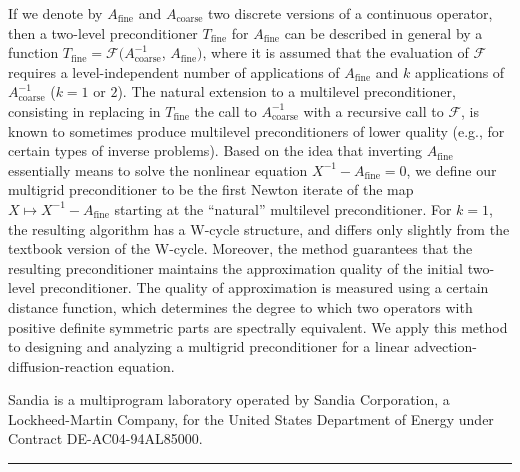 \documentclass[twosided]{report}
\begin{document}
If we denote by $A_{\mathrm{fine}}$ and
$A_{\mathrm{coarse}}$ two discrete versions of a continuous
operator, then a two-level preconditioner
$T_{\mathrm{fine}}$ for $A_{\mathrm{fine}}$ can be
described in general by a function
$T_{\mathrm{fine}} = {\mathcal F}(A_{\mathrm{coarse}}^{-1}$,
$A_{\mathrm{fine}})$,
where it is assumed that the evaluation of ${\mathcal F}$
requires a level-independent  number of applications of
$A_{\mathrm{fine}}$ and $k$  applications of
$A_{\mathrm{coarse}}^{-1}$  ($k=1$ or $2$).  The natural
extension to a multilevel preconditioner, consisting in
replacing in $T_{\mathrm{fine}}$ the call to
$A_{\mathrm{coarse}}^{-1}$ with a recursive call to
${\mathcal F}$, is known to sometimes produce multilevel
preconditioners of lower quality (e.g., for certain types
of inverse problems).  Based on the idea that inverting
$A_{\mathrm{fine}}$ essentially means to solve the
nonlinear  equation \mbox{$X^{-1} - A_{\mathrm{fine}}= 0$},
we define our multigrid preconditioner to be the first
Newton iterate of the map $X\mapsto X^{-1} -
A_{\mathrm{fine}}$ starting at the ``natural'' multilevel
preconditioner.  For $k=1$, the resulting algorithm has a
W-cycle structure, and differs only slightly from the
textbook version of the W-cycle.  Moreover, the method
guarantees that the resulting preconditioner maintains the
approximation quality of the initial two-level
preconditioner.  The quality of approximation is measured
using a certain distance function, which determines the
degree to which two operators with positive definite
symmetric parts are spectrally equivalent.  We apply this
method to designing and analyzing a multigrid
preconditioner for a linear advection-diffusion-reaction
equation.

{\small Sandia is a multiprogram laboratory operated by
Sandia Corporation, a Lockheed-Martin Company, for the
United States Department of Energy under
Contract DE-AC04-94AL85000.}



	\begin{center} \rule{6in}{1pt} \end{center}
\end{document}
